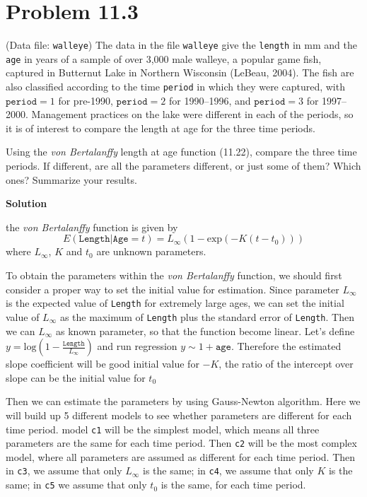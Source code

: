 \documentclass[12pt,oneside,a4paper]{article}\usepackage[]{graphicx}\usepackage[]{xcolor}
\title{\hmwkTitle}
\author{\hmwkAuthorName}
\date{\today}
\newcommand{\problem}[1]
{
    \clearpage
    \section*{Problem {#1}}
}
\newcommand{\solution}
{
    \vspace{15pt}
    \noindent\ignorespaces\textbf{\large Solution}\par
}
\newcommand{\m}[1]{\texttt{{#1}}}
\begin{document}
\maketitle



\problem{11.3}
(Data file: \m{walleye}) The data in the file \m{walleye} give the \m{length} in mm and the \m{age} in years of a sample of over 3,000 male walleye, a popular game fish, captured in Butternut Lake in Northern Wisconsin (LeBeau, 2004). The fish are also classified according to the time \m{period} in which they were captured, with $\m{period} = 1$ for pre-1990, $\m{period} = 2$ for 1990–1996, and $\m{period} = 3$ for 1997–2000. Management practices on the lake were different in each of the periods, so it is of interest to compare the length at age for the three time periods.

Using the \emph{von Bertalanffy} length at age function (11.22), compare the three time periods. If different, are all the parameters different, or just some of them? Which ones? Summarize your results.

\solution
the \emph{von Bertalanffy} function is given by 
$$E(\m{Length}|\m{Age} = t) = L_{\infty}(1 - \mathrm{exp}(-K(t - t_{0})))$$
where $L_{\infty}$, $K$ and $t_{0}$ are unknown parameters. 

To obtain the parameters within the \emph{von Bertalanffy} function, we should first consider a proper way to set the initial value for estimation. Since parameter $L_{\infty}$ is the expected value of \m{Length} for extremely large ages, we can set the initial value of $L_{\infty}$ as the maximum of \m{Length} plus the standard error of \m{Length}. Then we can $L_{\infty}$ as known parameter, so that the function become linear. Let's define $y = \mathrm{log}(1 - \frac{\m{Length}}{L_{\infty}})$ and run regression $y \sim 1 + \m{age}$. Therefore the estimated slope coefficient will be good initial value for $-K$, the ratio of the intercept over slope can be the initial value for $t_{0}$  

Then we can estimate the parameters by using Gauss-Newton algorithm. Here we will build up 5 different models to see whether parameters are different for each time period. model \m{c1} will be the simplest model, which means all three parameters are the same for each time period. Then \m{c2} will be the most complex model, where all parameters are assumed as different for each time period. Then in \m{c3}, we assume that only $L_{\infty}$ is the same; in \m{c4}, we assume that only $K$ is the same; in \m{c5} we assume that only $t_{0}$ is the same, for each time period. 
\end{document}
